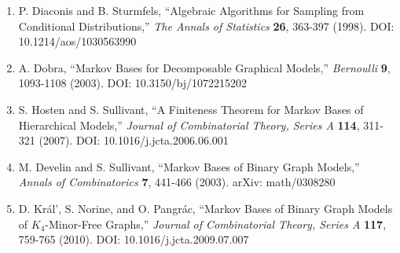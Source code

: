 \documentclass[
  11pt,
]{article}
\providecommand{\tightlist}{%
  \setlength{\itemsep}{0pt}\setlength{\parskip}{0pt}}
\begin{document}
\begin{enumerate}
\def\labelenumi{\arabic{enumi}.}
\tightlist
\item
  P. Diaconis and B. Sturmfels, ``Algebraic Algorithms for Sampling from
  Conditional Distributions,'' \emph{The Annals of Statistics}
  \textbf{26}, 363-397 (1998). DOI: 10.1214/aos/1030563990
\item
  A. Dobra, ``Markov Bases for Decomposable Graphical Models,''
  \emph{Bernoulli} \textbf{9}, 1093-1108 (2003). DOI:
  10.3150/bj/1072215202
\item
  S. Hosten and S. Sullivant, ``A Finiteness Theorem for Markov Bases of
  Hierarchical Models,'' \emph{Journal of Combinatorial Theory, Series
  A} \textbf{114}, 311-321 (2007). DOI: 10.1016/j.jcta.2006.06.001
\item
  M. Develin and S. Sullivant, ``Markov Bases of Binary Graph Models,''
  \emph{Annals of Combinatorics} \textbf{7}, 441-466 (2003). arXiv:
  math/0308280
\item
  D. Král', S. Norine, and O. Pangrác, ``Markov Bases of Binary Graph
  Models of \(K_4\)-Minor-Free Graphs,'' \emph{Journal of Combinatorial
  Theory, Series A} \textbf{117}, 759-765 (2010). DOI:
  10.1016/j.jcta.2009.07.007
\end{enumerate}
\end{document}
